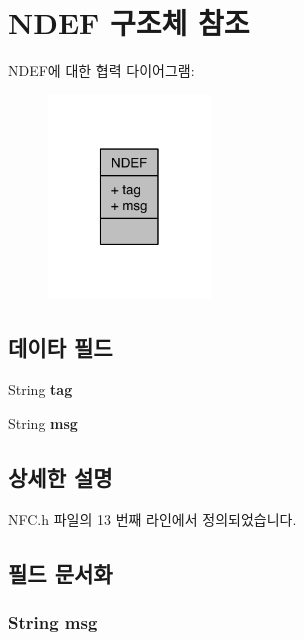 \hypertarget{struct_n_d_e_f}{\section{N\-D\-E\-F 구조체 참조}
\label{struct_n_d_e_f}
}


N\-D\-E\-F에 대한 협력 다이어그램\-:\nopagebreak
\begin{figure}[H]
\begin{center}
\leavevmode
\includegraphics[width=122pt]{d8/da5/struct_n_d_e_f__coll__graph}
\end{center}
\end{figure}
\subsection*{데이타 필드}
\begin{DoxyCompactItemize}
\item 
\hypertarget{struct_n_d_e_f_a3d1b2b9aa7be6b4548fc2e6dbd97103f}{String {\bfseries tag}}\label{struct_n_d_e_f_a3d1b2b9aa7be6b4548fc2e6dbd97103f}

\item 
\hypertarget{struct_n_d_e_f_a05873af37984ef32c8ba2a6308956bb3}{String {\bfseries msg}}\label{struct_n_d_e_f_a05873af37984ef32c8ba2a6308956bb3}

\end{DoxyCompactItemize}


\subsection{상세한 설명}


N\-F\-C.\-h 파일의 13 번째 라인에서 정의되었습니다.



\subsection{필드 문서화}
\hypertarget{struct_n_d_e_f_a05873af37984ef32c8ba2a6308956bb3}{
\subsubsection[{msg}]{\setlength{\rightskip}{0pt plus 5cm}String msg}}\label{struct_n_d_e_f_a05873af37984ef32c8ba2a6308956bb3}


